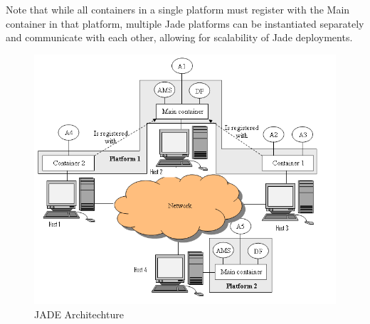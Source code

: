  Note that while all containers in a single platform must register with the Main container in that platform, multiple Jade platforms can be instantiated separately and communicate with each other, allowing for scalability of Jade deployments.
 
 \begin{figure}[h!]
 	\centering
	 	\includegraphics[width=\textwidth]{fig/jadeArchitecture}
	 	\caption{JADE Architechture}
	 	\label{fig:JADEarchitechture}
 \end{figure}



